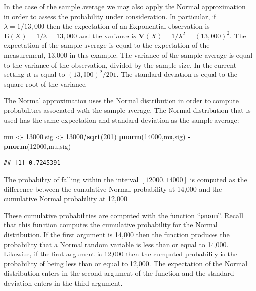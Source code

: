 \documentclass[
]{krantz}
\makeatletter
\newenvironment{Shaded}{\begin{snugshade}}{\end{snugshade}}
\newcommand{\DecValTok}[1]{\textcolor[rgb]{0.00,0.00,0.81}{#1}}
\newcommand{\KeywordTok}[1]{\textcolor[rgb]{0.13,0.29,0.53}{\textbf{#1}}}
\newcommand{\NormalTok}[1]{#1}
\newcommand{\OperatorTok}[1]{\textcolor[rgb]{0.81,0.36,0.00}{\textbf{#1}}}
\newcommand{\StringTok}[1]{\textcolor[rgb]{0.31,0.60,0.02}{#1}}
\newcommand{\Expec}{\mathbf{E}}
\newcommand{\Var}{\mathbf{V}}
\newenvironment{kframe}{%
\medskip{}
\setlength{\fboxsep}{.8em}
 \def\at@end@of@kframe{}%
 \ifinner\ifhmode%
  \def\at@end@of@kframe{\end{minipage}}%
  \begin{minipage}{\columnwidth}%
 \fi\fi%
 \def\FrameCommand##1{\hskip\@totalleftmargin \hskip-\fboxsep
 \colorbox{shadecolor}{##1}\hskip-\fboxsep
     \hskip-\linewidth \hskip-\@totalleftmargin \hskip\columnwidth}%
 \MakeFramed {\advance\hsize-\width
   \@totalleftmargin\z@ \linewidth\hsize
   \@setminipage}}%
 {\par\unskip\endMakeFramed%
 \at@end@of@kframe}
\renewenvironment{Shaded}{\begin{kframe}}{\end{kframe}}
\theoremstyle{definition}
\theoremstyle{definition}
\theoremstyle{definition}
\theoremstyle{remark}
\makeatother
\begin{document}
In the case of the sample average we may also apply the Normal
approximation in order to assess the probability under consideration. In
particular, if \(\lambda = 1/13,000\) then the expectation of an
Exponential observation is \(\Expec(X) = 1/\lambda = 13,000\) and the
variance is \(\Var(X) = 1/\lambda^2 = (13,000)^2\). The expectation of the
sample average is equal to the expectation of the measurement, 13,000 in
this example. The variance of the sample average is equal to the
variance of the observation, divided by the sample size. In the current
setting it is equal to \((13,000)^2/201\). The standard deviation is equal
to the square root of the variance.

The Normal approximation uses the Normal distribution in order to
compute probabilities associated with the sample average. The Normal
distribution that is used has the same expectation and standard
deviation as the sample average:

\begin{Shaded}
\begin{Highlighting}[]
\NormalTok{mu <-}\StringTok{ }\DecValTok{13000}
\NormalTok{sig <-}\StringTok{ }\DecValTok{13000}\OperatorTok{/}\KeywordTok{sqrt}\NormalTok{(}\DecValTok{201}\NormalTok{)}
\KeywordTok{pnorm}\NormalTok{(}\DecValTok{14000}\NormalTok{,mu,sig) }\OperatorTok{-}\StringTok{ }\KeywordTok{pnorm}\NormalTok{(}\DecValTok{12000}\NormalTok{,mu,sig)}
\end{Highlighting}
\end{Shaded}

\begin{verbatim}
## [1] 0.7245391
\end{verbatim}

The probability of falling within the interval \([12000, 14000]\) is
computed as the difference between the cumulative Normal probability at
14,000 and the cumulative Normal probability at 12,000.

These cumulative probabilities are computed with the function ``\texttt{pnorm}''.
Recall that this function computes the cumulative probability for the
Normal distribution. If the first argument is 14,000 then the function
produces the probability that a Normal random variable is less than or
equal to 14,000. Likewise, if the first argument is 12,000 then the
computed probability is the probability of being less than or equal to
12,000. The expectation of the Normal distribution enters in the second
argument of the function and the standard deviation enters in the third
argument.
\end{document}

